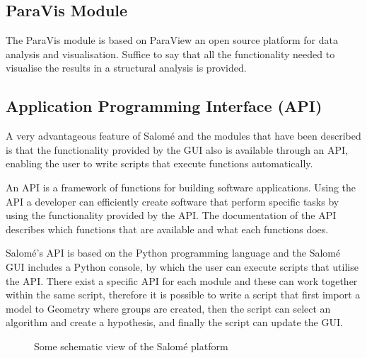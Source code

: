 \subsection{ParaVis Module} %
\label{sub:paravis_module}
The ParaVis module is based on ParaView an open source platform for data analysis and visualisation. Suffice to say that all the functionality needed to visualise the results in a structural analysis is provided.

\subsection{Application Programming Interface (API)} %
\label{sub:application_programming_interface_}
A very advantageous feature of Salomé and the modules that have been described is that the functionality provided by the GUI also is available through an API, enabling the user to write scripts that execute functions automatically.

An API is a framework of functions for building software applications. Using the API a developer can efficiently create software that perform specific tasks by using the functionality provided by the API. The documentation of the API describes which functions that are available and what each functions does.

Salomé's API is based on the Python programming language and the Salomé GUI includes a Python console, by which the user can execute scripts that utilise the API. There exist a specific API for each module and these can work together within the same script, therefore it is possible to write a script that first import a model to Geometry where groups are created, then the script can select an algorithm and create a hypothesis, and finally the script can update the GUI.

\begin{figure}[t]
	\begin{center}
	\end{center}
	\caption{Some schematic view of the Salomé platform}
	\label{fig:salome}
\end{figure}



